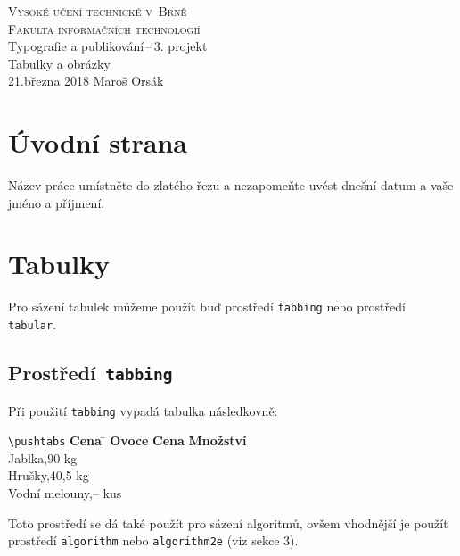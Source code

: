 \documentclass[11pt,a4paper]{article}
\begin{document}
\begin{titlepage}
\begin{center}
\textsc{\Huge Vysoké učení technické v~Brně\\ \medskip
\huge Fakulta informačních technologií}\\
\LARGE Typografie a publikování\,--\,3. projekt\\
\Huge Tabulky a obrázky\\
\Large 21.března 2018 \hfill         Maroš Orsák \newpage
\end{center}
\end{titlepage}

\newpage


\section{Úvodní strana}

Název práce umístněte do zlatého řezu a nezapomeňte uvést dnešní datum a vaše jméno a příjmení.


\section{Tabulky}

Pro sázení tabulek můžeme použít buď prostředí \texttt{tabbing} nebo prostředí \texttt{tabular}.

\subsection{Prostředí\texttt{ tabbing}}

Při použití \verb|tabbing| vypadá tabulka následkovně:



\begin{tabbing}
	\verb|\pushtabs| \qquad \= \textbf{Cena} \quad\= \kill
	\textbf{Ovoce} \> \textbf{Cena} \> \textbf{Množství} \\
	Jablka,90 kg\\
	Hrušky,40,5 kg\\
	Vodní melouny,--  kus\\
\end{tabbing}
Toto prostředí se dá také použít pro sázení algoritmů, ovšem vhodnější je použít prostředí \texttt{algorithm} nebo
\texttt{algorithm2e} (viz sekce 3).
\end{document}

